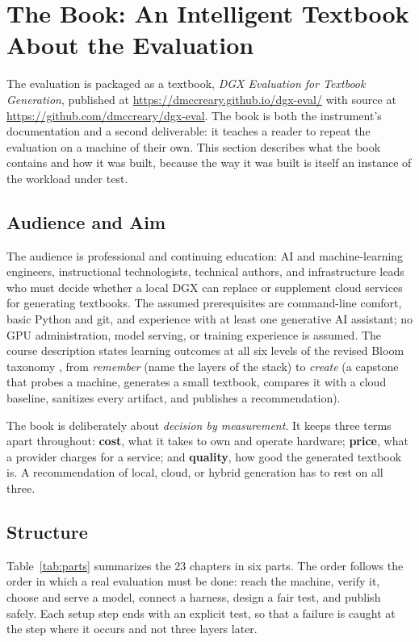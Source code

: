 \section{The Book: An Intelligent Textbook About the Evaluation}
\label{sec:book}

The evaluation is packaged as a textbook, \textit{DGX Evaluation for Textbook Generation}, published at \url{https://dmccreary.github.io/dgx-eval/} with source at \url{https://github.com/dmccreary/dgx-eval}. The book is both the instrument's documentation and a second deliverable: it teaches a reader to repeat the evaluation on a machine of their own. This section describes what the book contains and how it was built, because the way it was built is itself an instance of the workload under test.

\subsection{Audience and Aim}

The audience is professional and continuing education: AI and machine-learning engineers, instructional technologists, technical authors, and infrastructure leads who must decide whether a local DGX can replace or supplement cloud services for generating textbooks. The assumed prerequisites are command-line comfort, basic Python and git, and experience with at least one generative AI assistant; no GPU administration, model serving, or training experience is assumed. The course description states learning outcomes at all six levels of the revised Bloom taxonomy \cite{anderson2001taxonomy}, from \textit{remember} (name the layers of the stack) to \textit{create} (a capstone that probes a machine, generates a small textbook, compares it with a cloud baseline, sanitizes every artifact, and publishes a recommendation).

The book is deliberately about \textit{decision by measurement}. It keeps three terms apart throughout: \textbf{cost}, what it takes to own and operate hardware; \textbf{price}, what a provider charges for a service; and \textbf{quality}, how good the generated textbook is. A recommendation of local, cloud, or hybrid generation has to rest on all three.

\subsection{Structure}

Table~\ref{tab:parts} summarizes the 23 chapters in six parts. The order follows the order in which a real evaluation must be done: reach the machine, verify it, choose and serve a model, connect a harness, design a fair test, and publish safely. Each setup step ends with an explicit test, so that a failure is caught at the step where it occurs and not three layers later.

